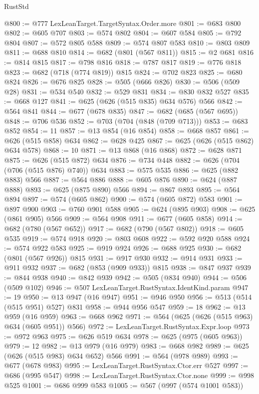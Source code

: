 \begin{lexlean}{RustStd}
\begin{coremodule}
{\begin{coremodule}
{{{{{{{{{{{{{{{@800 := @777 LexLeanTarget.TargetSyntax.Order.more
@801 := @683 @800
@802 := @605 @707
@803 := @574 @802
@804 := @607 @584
@805 := @792 @804
@807 := @572 @805 @588
@809 := @574 @807 @583
@810 := @803 @809
@811 := @688 @810
@814 := @682 (@801 (@567 @811))
@815 := @2 @681
@816 := @814 @815
@817 := @798 @816
@818 := @787 @817
@819 := @776 @818
@823 := @682 (@718 (@774 @819)) @815
@824 := @702 @823
@825 := @680 @824
@826 := @676 @825
@828 := @505 (@666 @826)
@830 := @506 (@509 @28)
@831 := @534 @540
@832 := @529 @831
@834 := @830 @832 @527
@835 := @668 @127
@841 := @625 (@626 (@515 @835) @634 @576) @566
@842 := @564 @841
@844 := @677 (@678 @835)
@847 := @682 (@685 (@567 @695))
@848 := @706 @536
@852 := @703 (@704 (@848 (@709 @713)))
@853 := @683 @852
@854 := 11
@857 := @13 @854 (@16 @854)
@858 := @668 @857
@861 := @626 (@515 @858) @634
@862 := @628 @425
@867 := @625 (@626 (@515 @862) @634 @578)
@868 := 10
@871 := @13 @868 (@16 @868)
@872 := @628 @871
@875 := @626 (@515 @872) @634
@876 := @734 @448
@882 := @626 (@704 (@706 (@515 @876) @740)) @634
@883 := @575 @535
@886 := @625 (@882 @883) @566
@887 := @564 @886
@888 := @605 @876
@890 := @624 (@887 @888)
@893 := @625 (@875 @890) @566
@894 := @867 @893
@895 := @564 @894
@897 := @574 (@605 @862)
@900 := @574 (@605 @872) @583
@901 := @897 @900
@903 := @760 @901 @588
@905 := @624 (@895 @903)
@908 := @625 (@861 @905) @566
@909 := @564 @908
@911 := @677 (@605 @858)
@914 := @682 (@780 (@567 @652))
@917 := @682 (@790 (@567 @802))
@918 := @605 @535
@919 := @574 @918
@920 := @803 @608
@922 := @592 @920 @588
@924 := @574 @922 @583
@925 := @919 @924
@926 := @688 @925
@930 := @682 (@801 (@567 @926)) @815
@931 := @917 @930
@932 := @914 @931
@933 := @911 @932
@937 := @682 (@853 (@909 @933)) @815
@938 := @847 @937
@939 := @844 @938
@940 := @842 @939
@942 := @505 (@834 @940)
@944 := @506 (@509 @102)
@946 := @507 LexLeanTarget.RustSyntax.IdentKind.param
@947 := 19
@950 := @13 @947 (@16 @947)
@951 := @946 @950
@956 := @513 (@514 (@515 @951) @527) @831
@958 := @944 @956 @547
@959 := 18
@962 := @13 @959 (@16 @959)
@963 := @668 @962
@971 := @564 (@625 (@626 (@515 @963) @634 (@605 @951)) @566)
@972 := LexLeanTarget.RustSyntax.Expr.loop
@973 := @972 @963
@975 := @626 @519 @634
@978 := @625 (@975 (@605 @963))
@979 := 12
@982 := @13 @979 (@16 @979)
@983 := @668 @982
@989 := @625 (@626 (@515 @983) @634 @652) @566
@991 := @564 (@978 @989)
@993 := @677 (@678 @983)
@995 := LexLeanTarget.RustSyntax.Ctor.err @527
@997 := @686 (@995 @547)
@998 := LexLeanTarget.RustSyntax.Ctor.none
@999 := @998 @525
@1001 := @686 @999 @583
@1005 := @567 (@997 (@574 @1001 @583))
}}}}}}}}}}}}}}}
\end{coremodule}}
\end{coremodule}
\end{lexlean}

